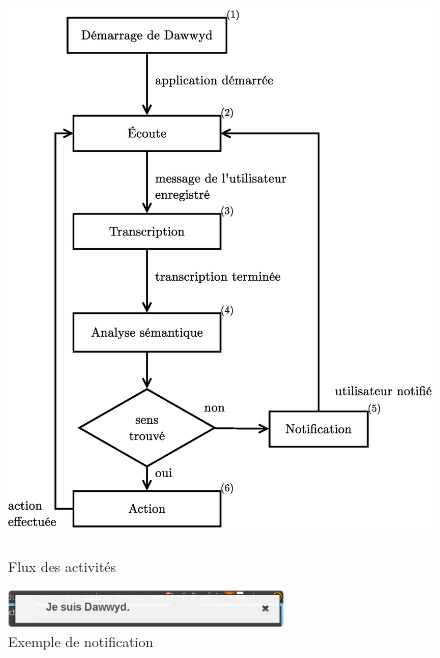 \documentclass[12pt]{article}
\begin{document}
    \begin{figure}
        \centering
        \includegraphics[height=15cm]{diagramme_flux.eps}
        \caption{Flux des activités}
    \end{figure}

    \begin{figure}
        \centering
        \includegraphics[height=1cm]{exemple_notif.png}
        \caption{Exemple de notification}
    \end{figure}
\end{document}
